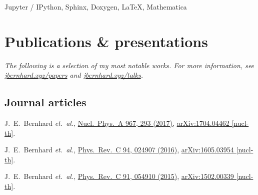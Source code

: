 \documentclass[letterpaper,10pt]{article}
\begin{document}
\begin{multicols}{2}
Jupyter / IPython, Sphinx, Doxygen, \LaTeX, Mathematica



\section{Publications \& presentations}

\vspace{-.5\parskip}
\emph{%
  \small
  The following is a selection of my most notable works.
  For more information, see \href{https://jbernhard.xyz/papers}{jbernhard.xyz/papers} and \href{https://jbernhard.xyz/talks}{jbernhard.xyz/talks}.
}
\vspace{-.5\parskip}



\subsection{Journal articles}

J.~E.~Bernhard \textit{et.\ al.},
\href{https://www.sciencedirect.com/science/article/pii/S0375947417301549}{Nucl.\ Phys.\ A 967, 293 (2017)},
\href{https://arxiv.org/abs/1704.04462}{arXiv:1704.04462 [nucl-th]}.

J.~E.~Bernhard \textit{et.\ al.},
\href{https://journals.aps.org/prc/abstract/10.1103/PhysRevC.94.024907}{Phys.\ Rev.\ C 94, 024907 (2016)},
\href{https://arxiv.org/abs/1605.03954}{arXiv:1605.03954 [nucl-th]}.

J.~E.~Bernhard \textit{et.\ al.},
\href{https://journals.aps.org/prc/abstract/10.1103/PhysRevC.91.054910}{Phys.\ Rev.\ C 91, 054910 (2015)},
\href{https://arxiv.org/abs/1502.00339}{arXiv:1502.00339 [nucl-th]}.


\end{multicols}
\end{document}
